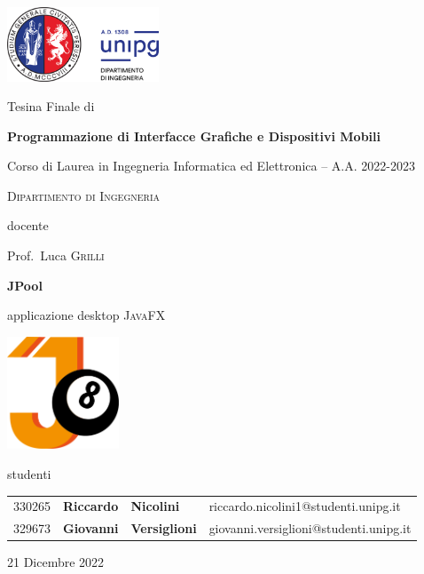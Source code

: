 \documentclass[12pt,a4paper]{report}
\begin{document}

\begin{titlepage} %

	\centering
	
	\includegraphics[width=0.34\textwidth]{logo-unipg}\par\vspace{1cm}
	
	\large{Tesina Finale di}\par
	\large{\textbf{Programmazione di Interfacce Grafiche e Dispositivi Mobili}}\par
	\small{Corso di Laurea in Ingegneria Informatica ed Elettronica -- A.A. 2022-2023}\par
	\textsc{\small{Dipartimento di Ingegneria}}\par

	\vspace{0.5cm}
	docente\par
	Prof.~Luca \textsc{Grilli}

	\vspace{1cm}
	\textbf{\huge{JPool}}\par
	\vspace{0.2cm}
	applicazione desktop \textsc{JavaFX}\par
	
	\vspace{2cm}
	\includegraphics[width=0.25\textwidth]{Logo.png}\par\vspace{1cm}
	
	\vspace{1cm}
	\large{studenti}\par
	\vspace{0.2cm}
	\begin{tabular}{ l l l l }
	\large{330265} & \large{\textbf{Riccardo}} & \large{\textbf{Nicolini}} & \large{riccardo.nicolini1@studenti.unipg.it}\\
	\large{329673} & \large{\textbf{Giovanni}} & \large{\textbf{Versiglioni}} & \large{giovanni.versiglioni@studenti.unipg.it}\\
	\end{tabular}

	\vfill
	\raggedright
	\small{21 Dicembre 2022}
	
\end{titlepage} %
\restoregeometry
\end{document}
